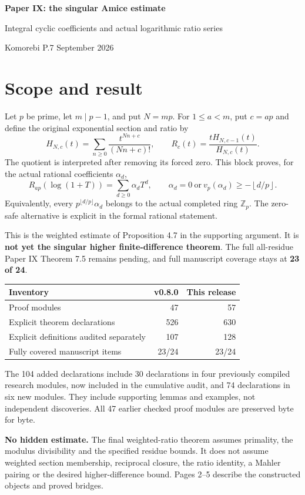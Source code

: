 \documentclass[11pt]{article}
\newcommand{\Z}{\mathbb Z}\newcommand{\Q}{\mathbb Q}\newcommand{\N}{\mathbb N}\newcommand{\F}{\mathbb F}
\begin{document}
{\LARGE\bfseries Paper IX: the singular Amice estimate}\par
{\large Integral cyclic coefficients and actual logarithmic ratio series}\par
Komorebi P.\hfill 7 September 2026

\section*{Scope and result}
Let $p$ be prime, let $m\mid p-1$, and put $N=mp$. For $1\le a<m$, put $c=ap$ and define the original exponential section and ratio by
\[
 H_{N,c}(t)=\sum_{n\ge0}\frac{t^{Nn+c}}{(Nn+c)!},\qquad
 R_c(t)=\frac{tH_{N,c-1}(t)}{H_{N,c}(t)}.
\]
The quotient is interpreted after removing its forced zero. This block proves, for the actual rational coefficients $\alpha_d$,
\[
 R_{ap}(\log(1+T))=\sum_{d\ge0}\alpha_dT^d,
 \qquad
 \boxed{\alpha_d=0\ \text{or}\ v_p(\alpha_d)\ge-\left\lfloor d/p\right\rfloor.}
\]
Equivalently, every $p^{\lfloor d/p\rfloor}\alpha_d$ belongs to the actual completed ring $\Z_p$. The zero-safe alternative is explicit in the formal rational statement.

This is the weighted estimate of Proposition 4.7 in the supporting argument. It is \textbf{not yet the singular higher finite-difference theorem}. The full all-residue Paper IX Theorem 7.5 remains pending, and full manuscript coverage stays at \textbf{23 of 24}.

\begin{center}\begin{tabular}{lrr}\toprule
Inventory & v0.8.0 & This release\\\midrule
Proof modules &47&57\\
Explicit theorem declarations &526&630\\
Explicit definitions audited separately &107&128\\
Fully covered manuscript items &23/24&23/24\\\bottomrule
\end{tabular}\end{center}
The 104 added declarations include 30 declarations in four previously compiled research modules, now included in the cumulative audit, and 74 declarations in six new modules. They include supporting lemmas and examples, not independent discoveries. All 47 earlier checked proof modules are preserved byte for byte.

\textbf{No hidden estimate.} The final weighted-ratio theorem assumes primality, the modulus divisibility and the specified residue bounds. It does not assume weighted section membership, reciprocal closure, the ratio identity, a Mahler pairing or the desired higher-difference bound. Pages 2--5 describe the constructed objects and proved bridges.
\newpage
\end{document}

